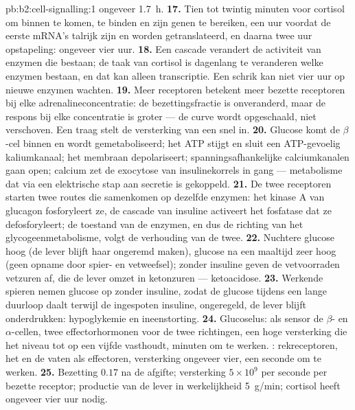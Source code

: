 \begin{solution}{pb:b2:cell-signalling:1}
ongeveer \qty{1.7}{h}.
\textbf{17.} Tien tot twintig minuten voor cortisol om binnen te komen, te
binden en zijn genen te bereiken, een uur voordat de eerste mRNA's talrijk
zijn en worden getranslateerd, en daarna twee uur opstapeling: ongeveer vier
uur.
\textbf{18.} Een cascade verandert de activiteit van enzymen die bestaan;
de taak van cortisol is dagenlang te veranderen welke enzymen bestaan, en dat
kan alleen transcriptie. Een schrik kan niet vier uur op nieuwe enzymen
wachten.
\textbf{19.} Meer receptoren betekent meer bezette receptoren bij elke
adrenalineconcentratie: de bezettingsfractie is onveranderd, maar de respons
bij elke concentratie is groter --- de curve wordt opgeschaald, niet
verschoven. Een traag  stelt de versterking van een snel  in.
\textbf{20.} Glucose komt de $\beta$-cel binnen en wordt gemetaboliseerd;
het ATP stijgt en sluit een ATP-gevoelig kaliumkanaal; het membraan
depolariseert; spanningsafhankelijke calciumkanalen gaan open; calcium zet de
exocytose van insulinekorrels in gang --- metabolisme dat via een elektrische
stap aan secretie is gekoppeld.
\textbf{21.} De twee receptoren starten twee routes die samenkomen op dezelfde
enzymen: het kinase A van glucagon fosforyleert ze, de cascade van insuline
activeert het fosfatase dat ze defosforyleert; de toestand van de enzymen, en
dus de richting van het glycogeenmetabolisme, volgt de verhouding van de
twee.
\textbf{22.} Nuchtere glucose hoog (de lever blijft haar ongeremd maken),
glucose na een maaltijd zeer hoog (geen opname door spier- en vetweefsel);
zonder insuline geven de vetvoorraden vetzuren af, die de lever omzet in
ketonzuren --- ketoacidose.
\textbf{23.} Werkende spieren nemen glucose op zonder insuline, zodat de
glucose tijdens een lange duurloop daalt terwijl de ingespoten insuline,
ongeregeld, de lever blijft onderdrukken: hypoglykemie en ineenstorting.
\textbf{24.} Glucoselus: als sensor de $\beta$- en $\alpha$-cellen, twee
effectorhormonen voor de twee richtingen, een hoge versterking die het niveau
tot op een vijfde vasthoudt, minuten om te werken. : rekreceptoren,
het  en de vaten als effectoren, versterking ongeveer vier, een seconde
om te werken.
\textbf{25.} Bezetting $0.17$ na de afgifte; versterking $5\times 10^{9}$ per seconde
per bezette receptor; productie van de lever in werkelijkheid
\qty{5}{g/min}; cortisol heeft ongeveer vier uur nodig.
\end{solution}
